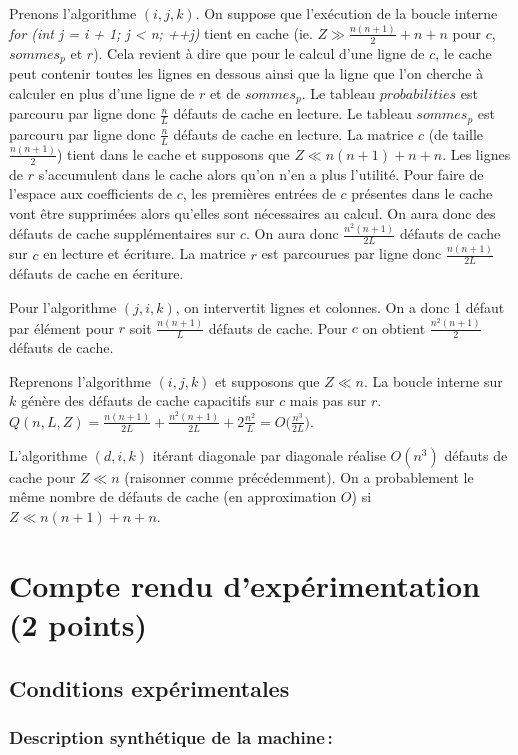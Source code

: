 \documentclass[a4paper, 10pt, french]{article}
\begin{document}
Prenons l'algorithme $(i, j, k)$. On suppose que l'exécution de la boucle interne {\em for (int j = i + 1; j < n; ++j)} tient en cache (ie. $Z \gg \frac{n(n + 1)}{2} + n + n$ pour $c$, $sommes_p$ et $r$).
Cela revient à dire que pour le calcul d'une ligne de $c$, le cache peut contenir toutes les lignes en dessous ainsi que la ligne que l'on cherche à calculer en plus d'une ligne de $r$ et de $sommes_p$.
Le tableau $probabilities$ est parcouru par ligne donc $\frac{n}{L}$ défauts de cache en lecture.
Le tableau $sommes_p$ est parcouru par ligne donc $\frac{n}{L}$ défauts de cache en lecture.
La matrice $c$ (de taille $\frac{n(n + 1)}{2}$) tient dans le cache et supposons que $Z \ll n(n + 1) + n + n$. Les lignes de $r$ s'accumulent dans le cache alors qu'on n'en a plus l'utilité.
Pour faire de l'espace aux coefficients de $c$, les premières entrées de $c$ présentes dans le cache vont être supprimées alors qu'elles sont nécessaires au calcul.
On aura donc des défauts de cache supplémentaires sur $c$. On aura donc $\frac{n^2(n + 1)}{2L}$ défauts de cache sur $c$ en lecture et écriture.
La matrice $r$ est parcourues par ligne donc $\frac{n(n + 1)}{2L}$ défauts de cache en écriture.

Pour l'algorithme $(j, i, k)$, on intervertit lignes et colonnes. On a donc 1 défaut par élément pour $r$ soit $\frac{n(n + 1)}{L}$ défauts de cache. 
Pour $c$ on obtient $\frac{n^2(n + 1)}{2}$ défauts de cache.

Reprenons l'algorithme $(i, j, k)$ et supposons que $Z \ll n$. La boucle interne sur $k$ génère des défauts de cache capacitifs sur $c$ mais pas sur $r$.
$Q(n, L, Z) = \frac{n(n + 1)}{2L} + \frac{n^2(n + 1)}{2L} + 2\frac{n^2}{L} = O\bigg(\frac{n^3}{2L}\bigg)$.

L'algorithme $(d, i, k)$ itérant diagonale par diagonale réalise $O(n^3)$ défauts de cache pour $Z \ll n$ (raisonner comme précédemment). 
On a probablement le même nombre de défauts de cache (en approximation $O$) si $Z \ll n(n + 1) + n + n$.

\section{Compte rendu d'expérimentation (2 points)}
\subsection{Conditions expérimentales}

\subsubsection{Description synthétique de la machine\,:}
\end{document}
